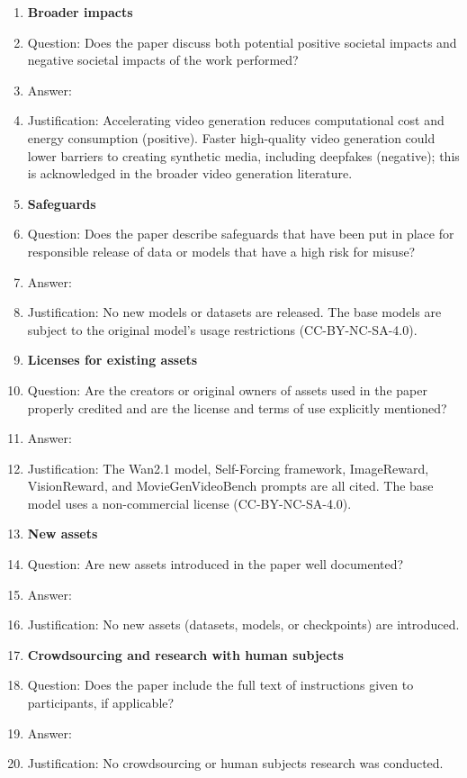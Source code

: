 \begin{enumerate}
\item {\bf Broader impacts}
    \item[] Question: Does the paper discuss both potential positive societal impacts and negative societal impacts of the work performed?
    \item[] Answer: \answerYes{}
    \item[] Justification: Accelerating video generation reduces computational cost and energy consumption (positive). Faster high-quality video generation could lower barriers to creating synthetic media, including deepfakes (negative); this is acknowledged in the broader video generation literature.

\item {\bf Safeguards}
    \item[] Question: Does the paper describe safeguards that have been put in place for responsible release of data or models that have a high risk for misuse?
    \item[] Answer: \answerNA{}
    \item[] Justification: No new models or datasets are released. The base models are subject to the original model's usage restrictions (CC-BY-NC-SA-4.0).

\item {\bf Licenses for existing assets}
    \item[] Question: Are the creators or original owners of assets used in the paper properly credited and are the license and terms of use explicitly mentioned?
    \item[] Answer: \answerYes{}
    \item[] Justification: The Wan2.1 model, Self-Forcing framework, ImageReward, VisionReward, and MovieGenVideoBench prompts are all cited. The base model uses a non-commercial license (CC-BY-NC-SA-4.0).

\item {\bf New assets}
    \item[] Question: Are new assets introduced in the paper well documented?
    \item[] Answer: \answerNA{}
    \item[] Justification: No new assets (datasets, models, or checkpoints) are introduced.

\item {\bf Crowdsourcing and research with human subjects}
    \item[] Question: Does the paper include the full text of instructions given to participants, if applicable?
    \item[] Answer: \answerNA{}
    \item[] Justification: No crowdsourcing or human subjects research was conducted.


\end{enumerate}
